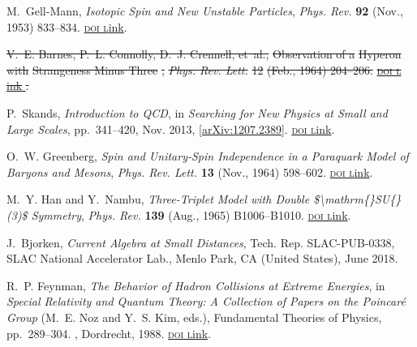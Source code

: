 \documentclass[ALICE,manyauthors]{cernphprep}
\providecommand{\DIFdeltex}[1]{{\protect\color{red}\sout{#1}}}                      %
\providecommand{\DIFdelbegin}{} %
\providecommand{\DIFdelend}{} %
\providecommand{\DIFdel}[1]{\texorpdfstring{\DIFdeltex{#1}}{}} %
\newcommand{\DIFscaledelfig}{0.5}
\newlength{\DIFdelgraphicswidth} %
\newlength{\DIFdelgraphicsheight} %
\newcommand{\DIFdelincludegraphics}[2][]{%
\sbox{\DIFdelgraphicsbox}{\DIFOincludegraphics[#1]{#2}}%
\settoboxwidth{\DIFdelgraphicswidth}{\DIFdelgraphicsbox} %
\settoboxtotalheight{\DIFdelgraphicsheight}{\DIFdelgraphicsbox} %
\scalebox{\DIFscaledelfig}{%
\parbox[b]{\DIFdelgraphicswidth}{\usebox{\DIFdelgraphicsbox}\\[-\baselineskip] \rule{\DIFdelgraphicswidth}{0em}}\llap{\resizebox{\DIFdelgraphicswidth}{\DIFdelgraphicsheight}{%
\setlength{\unitlength}{\DIFdelgraphicswidth}%
\begin{picture}(1,1)%
\thicklines\linethickness{2pt} %
{\color[rgb]{1,0,0}\put(0,0){\framebox(1,1){}}}%
{\color[rgb]{1,0,0}\put(0,0){\line( 1,1){1}}}%
{\color[rgb]{1,0,0}\put(0,1){\line(1,-1){1}}}%
\end{picture}%
}\hspace*{3pt}}} %
} %
\DeclareRobustCommand{\DIFdelbegin}{\DIFOdelbegin \let\includegraphics\DIFdelincludegraphics} %
\DeclareRobustCommand{\DIFdelend}{\DIFOaddend \let\includegraphics\DIFOincludegraphics} %
\begin{document}
\begin{thebibliography}{100}
M.~{Gell-Mann}, {\it Isotopic {{Spin}} and {{New Unstable Particles}}},
  {\textsl{Phys. Rev.}} {\footnotesize \bf 92} (Nov., 1953) 833--834.
  \href{http://dx.doi.org/10.1103/PhysRev.92.833}{\footnotesize
  \textrm{\textsc{doi l}ink}}.

\DIFdelbegin {}
\DIFdel{V.~E. Barnes, P.~L. Connolly, D.~J. Crennell, et~al., }%
\DIFdel{Observation of a
  }%
\DIFdel{Hyperon}%
\DIFdel{with }%
\DIFdel{Strangeness Minus Three}%
\DIFdel{,  }%
\textsl{\DIFdel{Phys. Rev. Lett.}}%
\DIFdel{12}%
\DIFdel{(Feb., 1964) 204--206.
  }\href{http://dx.doi.org/10.1103/PhysRevLett.13.585}{%
\textrm{\textsc{\DIFdel{doi l}}%
\DIFdel{ink}}%
}%
\DIFdel{.
}%

\DIFdelend {}
P.~Skands, {\it Introduction to {{QCD}}},  in {\em Searching for {{New
  Physics}} at {{Small}} and {{Large Scales}}}, pp.~341--420, Nov. 2013,
  [\href{https://arxiv.org/abs/1207.2389}{{\footnotesize arXiv:1207.2389}}].
\newblock \href{http://dx.doi.org/10.1142/9789814525220_0008}{\footnotesize
  \textrm{\textsc{doi l}ink}}.

O.~W. Greenberg, {\it Spin and {{Unitary-Spin Independence}} in a {{Paraquark
  Model}} of {{Baryons}} and {{Mesons}}},  {\textsl{Phys. Rev. Lett.}}
  {\footnotesize \bf 13} (Nov., 1964) 598--602.
  \href{http://dx.doi.org/10.1103/PhysRevLett.13.598}{\footnotesize
  \textrm{\textsc{doi l}ink}}.

M.~Y. Han and Y.~Nambu, {\it Three-{{Triplet Model}} with {{Double}}
  \$\textbackslash mathrm\{\vphantom\}{{SU}}\vphantom\{\}(3)\$ {{Symmetry}}},
  {\textsl{Phys. Rev.}} {\footnotesize \bf 139} (Aug., 1965) B1006--B1010.
  \href{http://dx.doi.org/10.1103/PhysRev.139.B1006}{\footnotesize
  \textrm{\textsc{doi l}ink}}.

J.~Bjorken, {\it Current {{Algebra}} at {{Small Distances}}},  Tech. Rep.
  SLAC-PUB-0338, {SLAC National Accelerator Lab., Menlo Park, CA (United
  States)}, June 2018.

R.~P. Feynman, {\it The {{Behavior}} of {{Hadron Collisions}} at {{Extreme
  Energies}}},  in {\em Special {{Relativity}} and {{Quantum Theory}}: {{A
  Collection}} of {{Papers}} on the {{Poincar\'e Group}}} (M.~E. Noz and Y.~S.
  Kim, eds.), Fundamental {{Theories}} of {{Physics}}, pp.~289--304.
, {Dordrecht}, 1988.
\newblock \href{http://dx.doi.org/10.1007/978-94-009-3051-3_25}{\footnotesize
  \textrm{\textsc{doi l}ink}}.


\end{thebibliography}
\end{document}
